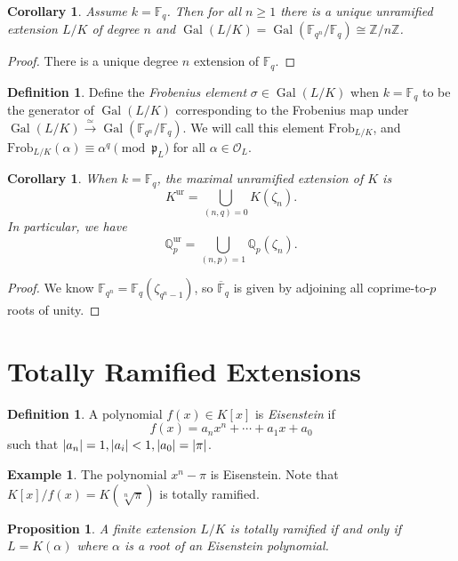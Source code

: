\documentclass[leqno, openany]{memoir}
\newtheorem{cor}[thm]{Corollary}
\newtheorem{prop}[thm]{Proposition}
\theoremstyle{definition}
\newtheorem{defn}[thm]{Definition}
\newtheorem{exm}[thm]{Example}
\theoremstyle{remark}
\theoremstyle{plain}
\theoremstyle{definition}
\theoremstyle{remark}
\newcommand{\F}{\mathbb{F}}
\newcommand{\Z}{\mathbb{Z}}
\newcommand{\Q}{\mathbb{Q}}
\newcommand{\mc}[1]{\mathcal{#1}}
\newcommand{\mf}[1]{\mathfrak{#1}}
\newcommand{\mr}[1]{\mathrm{#1}}
\newcommand{\ol}[1]{\overline{#1}}
\DeclareMathOperator{\Gal}{Gal}
\begin{document}
\begin{cor}
    Assume $k = \F_q$. Then for all $n \geq 1$ there is a unique unramified extension $L/K$ of degree $n$ and $\Gal(L/K) = \Gal(\F_{q^n} / \F_q) \cong \Z/n\Z$.
\end{cor}

\begin{proof}
    There is a unique degree $n$ extension of $\F_q$.
\end{proof}

\begin{defn}
    Define the \textit{Frobenius element} $\sigma \in \Gal(L/K)$ when $k = \F_q$ to be the generator of $\Gal(L/K)$ corresponding to the Frobenius map under $\Gal(L/K) \xrightarrow{\simeq} \Gal(\F_{q^n} / \F_q)$. We will call this element $\mr{Frob}_{L/K}$, and $\mr{Frob}_{L/K}(\alpha) \equiv \alpha^q \pmod \mf{p}_L$ for all $\alpha \in \mc{O}_L$.
\end{defn}

\begin{cor}
    When $k = \F_q$, the maximal unramified extension of $K$ is
    \[ K^{\mr{ur}} = \bigcup_{(n,q) = 0} K(\zeta_n). \]
    In particular, we have
    \[ \Q_p^{\mr{ur}} = \bigcup_{(n,p) = 1} \Q_p(\zeta_n). \]
\end{cor}

\begin{proof}
    We know $\F_{q^n} = \F_q(\zeta_{q^n-1})$, so $\ol{\F}_q$ is given by adjoining all coprime-to-$p$ roots of unity.
\end{proof}

\section{Totally Ramified Extensions}%
\label{sec:totally_ramified_extensions}

\begin{defn}
    A polynomial $f(x) \in K[x]$ is \textit{Eisenstein} if 
    \[ f(x) = a_n x^n + \cdots + a_1 x + a_0 \]
    such that $\abs{a_n} = 1, \abs{a_i} < 1, \abs{a_0} = \abs{\pi}$.
\end{defn}

\begin{exm}
    The polynomial $x^n - \pi$ is Eisenstein. Note that $K[x] / f(x) = K(\sqrt[n]{\pi})$ is totally ramified.
\end{exm}

\begin{prop}
    A finite extension $L/K$ is totally ramified if and only if $L = K(\alpha)$ where $\alpha$ is a root of an Eisenstein polynomial.
\end{prop}
\end{document}
